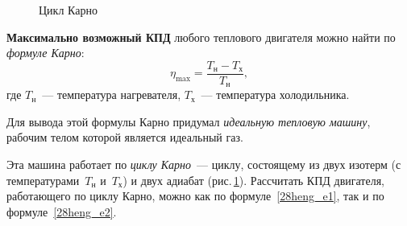 \documentclass[main.tex]{subfiles}
\begin{document}
{%
\setlength\intextsep{0pt}
\begin{figure}
    \centering
    \caption{Цикл Карно}
    \label{fig:p87}
\end{figure}

\textbf{Максимально возможный КПД} любого теплового двигателя можно найти по \emph{формуле Карно}:
\begin{equation}
    \label{28heng_e2}
    \eta_{\max}=\frac{T_\text{н}-T_\text{х}}{T_\text{н}},
\end{equation}
где $T_\text{н}$~--- температура нагревателя, $T_\text{х}$~--- температура холодильника.

Для вывода этой формулы Карно придумал \emph{идеальную тепловую машину}, рабочим телом которой является идеальный газ. 

Эта машина работает по \emph{циклу Карно}~--- циклу, состоящему из двух изотерм (с температурами~$T_\text{н}$ и~$T_\text{х}$) и двух адиабат (рис.\,\ref{fig:p87}). 
Рассчитать КПД двигателя, работающего по циклу Карно, можно как по формуле~\eqref{28heng_e1}, так и по формуле~\eqref{28heng_e2}.

}












 
\end{document}

